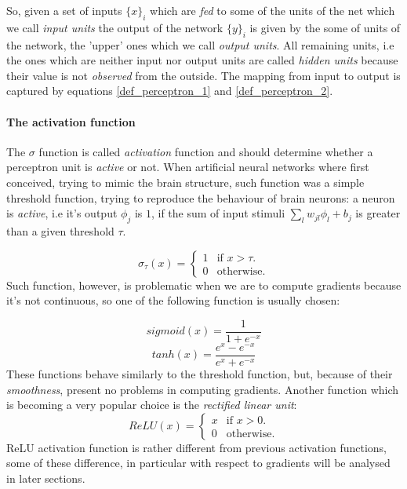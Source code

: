 So, given a set of inputs $\{x\}_i$ which are \textit{fed} to some of the units of the net which we call \textit{input units} the output of the network $\{y\}_i$ is given by the
some of units of the network, the 'upper' ones which we call \textit{output units}. All remaining units, i.e the ones which are neither input nor output units
are called \textit{hidden units} because their value is not \textit{observed} from the outside. The mapping from input to output is captured by equations \ref{def_perceptron_1} and 
\ref{def_perceptron_2}. 

\paragraph{The activation function}
The $\sigma$ function is called \textit{activation} function and should determine whether a perceptron unit is \textit{active} or not. When artificial neural networks where first conceived,
trying to mimic the brain structure, such function was a simple threshold function, trying to reproduce the behaviour of brain neurons: a neuron is \textit{active}, i.e it's output $\phi_j$ is $1$, if
the sum of input stimuli $\sum_l w_{jl}\phi_l +b_j$ is greater than a given threshold $\tau$.

\begin{equation}
  \sigma_{\tau}(x)=\begin{cases}
    1 & \text{if $x>\tau$}.\\
    0 & \text{otherwise}.
  \end{cases}
\end{equation}
Such function, however, is problematic when we are to compute gradients because it's not continuous, so one of the following function is usually chosen:

\begin{equation}
 sigmoid(x)=\frac{1}{1+e^{-x}}
\end{equation}
\begin{equation}
 tanh(x)=\frac{e^x-e^{-x}}{e^x+e^{-x}}
\end{equation}
These functions behave similarly to the threshold function, but, because of their \textit{smoothness}, present no problems in computing gradients.
Another function which is becoming a very popular choice is the \textit{rectified linear unit}:
\begin{equation}
  ReLU(x)=\begin{cases}
    x & \text{if $x>0$}.\\
    0 & \text{otherwise}.
  \end{cases}
\end{equation}
ReLU activation function is rather different from previous activation functions, some of these difference, in particular with respect to gradients will be analysed in later sections.

